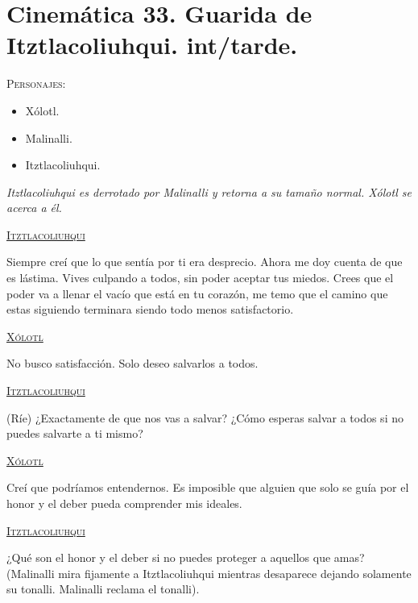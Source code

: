 \documentclass[11pt,letterpaper]{article}
\begin{document}
\section{Cinemática 33. Guarida de Itztlacoliuhqui. int/tarde.}
 \textsc{Personajes}:
 \begin{itemize}
 \item Xólotl.
 \item Malinalli.
 \item Itztlacoliuhqui.
 \end{itemize}
\textit{Itztlacoliuhqui es derrotado por Malinalli y retorna a su tamaño normal. Xólotl se acerca a él.}
\begin{center}
\textsc{\underline{Itztlacoliuhqui}}
\\
\par
Siempre creí que lo que sentía por ti era desprecio. Ahora me doy cuenta de que es lástima. Vives culpando a todos, sin poder aceptar tus miedos. Crees que el poder va a llenar el vacío que está en tu corazón, me temo que el camino que estas siguiendo terminara siendo todo menos satisfactorio.
\\
\par
\textsc{\underline{Xólotl}}
\\
\par
No busco satisfacción. Solo deseo salvarlos a todos.
\\
\par
\textsc{\underline{Itztlacoliuhqui}}
\\
\par
(Ríe) ¿Exactamente de que nos vas a salvar? ¿Cómo esperas salvar a todos si no puedes salvarte a ti mismo?
\\
\par
\textsc{\underline{Xólotl}}
\\
\par
Creí que podríamos entendernos. Es imposible que alguien que solo se guía por el honor y el deber pueda comprender mis ideales.
\\
\par
\textsc{\underline{Itztlacoliuhqui}}
\\
\par
¿Qué son el honor y el deber si no puedes proteger a aquellos que amas? (Malinalli mira fijamente a Itztlacoliuhqui mientras desaparece dejando solamente su tonalli. Malinalli reclama el tonalli).
\end{center}
\end{document}
